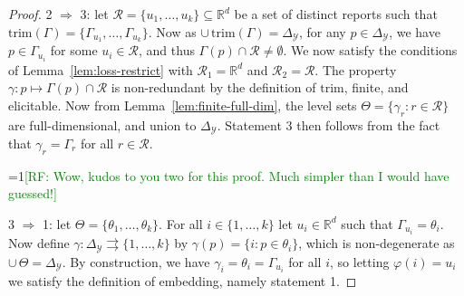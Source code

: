 \documentclass[anon,12pt]{colt2019}
\newcommand{\Comments}{1}
\newcommand{\mynote}[2]{\ifnum\Comments=1\textcolor{#1}{#2}\fi}
\newcommand{\raf}[1]{\mynote{green}{[RF: #1]}}
\newcommand{\reals}{\mathbb{R}}
\newcommand{\simplex}{\Delta_\Y}
\newcommand{\R}{\mathcal{R}}
\newcommand{\Y}{\mathcal{Y}}
\newcommand{\toto}{\rightrightarrows}
\newcommand{\trim}{\mathrm{trim}}
\DeclareMathOperator*{\argmin}{arg\,min}
\begin{document}
\begin{proof}

  2 $\Rightarrow$ 3: let $\R = \{u_1,\ldots,u_k\} \subseteq\reals^d$ be a set of distinct reports such that $\trim(\Gamma) = \{\Gamma_{u_1},\ldots,\Gamma_{u_k}\}$.
  Now as $\cup\,\trim(\Gamma) = \simplex$, for any $p\in\simplex$, we have $p\in\Gamma_{u_i}$ for some $u_i\in\R$, and thus $\Gamma(p) \cap \R \neq \emptyset$.
  We now satisfy the conditions of Lemma~\ref{lem:loss-restrict} with $\R_1 = \reals^d$ and $\R_2 = \R$.
  The property $\gamma:p\mapsto\Gamma(p)\cap\R$ is non-redundant by the definition of $\trim$, finite, and elicitable.
  Now from Lemma~\ref{lem:finite-full-dim}, the level sets $\Theta = \{\gamma_r:r\in\R\}$ are full-dimensional, and union to $\simplex$.
  Statement 3 then follows from the fact that $\gamma_r = \Gamma_r$ for all $r\in\R$.



  \raf{Wow, kudos to you two for this proof.  Much simpler than I would have guessed!}

  3 $\Rightarrow$ 1: let $\Theta = \{\theta_1,\ldots,\theta_k\}$.
  For all $i\in\{1,\ldots,k\}$ let $u_i\in\reals^d$ such that $\Gamma_{u_i} = \theta_i$.
  Now define $\gamma:\simplex\toto\{1,\ldots,k\}$ by $\gamma(p) = \{i : p\in\theta_i\}$, which is non-degenerate as $\cup\,\Theta = \simplex$.
  By construction, we have $\gamma_i = \theta_i = \Gamma_{u_i}$ for all $i$, so letting $\varphi(i) = u_i$ we satisfy the definition of embedding, namely statement 1.
\end{proof}
\end{document}

